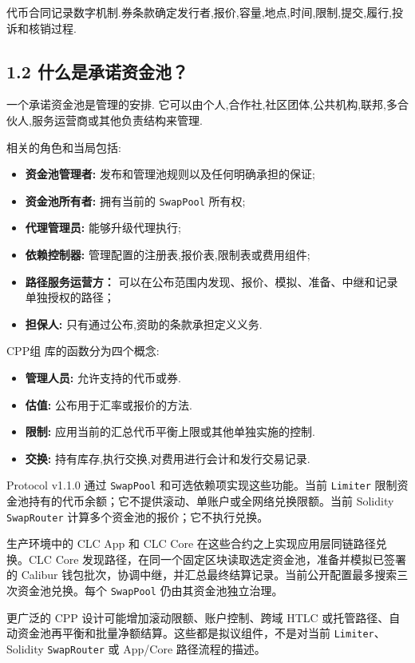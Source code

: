 \documentclass[11pt]{article}
\begin{document}
代币合同记录数字机制.券条款确定发行者,报价,容量,地点,时间,限制,提交,履行,投诉和核销过程.

\subsection*{1.2 什么是承诺资金池？}

一个承诺资金池是管理的安排. 它可以由个人,合作社,社区团体,公共机构,联邦,多合伙人,服务运营商或其他负责结构来管理.

相关的角色和当局包括:

\begin{itemize}[leftmargin=*]
\item \textbf{资金池管理者:} 发布和管理池规则以及任何明确承担的保证;
\item \textbf{资金池所有者:} 拥有当前的 \texttt{SwapPool} 所有权;
\item \textbf{代理管理员:} 能够升级代理执行;
\item \textbf{依赖控制器:} 管理配置的注册表,报价表,限制表或费用组件;
\item \textbf{路径服务运营方：} 可以在公布范围内发现、报价、模拟、准备、中继和记录单独授权的路径；
\item \textbf{担保人:} 只有通过公布,资助的条款承担定义义务.
\end{itemize}
CPP组 库的函数分为四个概念:

\begin{itemize}[leftmargin=*]
\item \textbf{管理人员:} 允许支持的代币或券.
\item \textbf{估值:} 公布用于汇率或报价的方法.
\item \textbf{限制:} 应用当前的汇总代币平衡上限或其他单独实施的控制.
\item \textbf{交换:} 持有库存,执行交换,对费用进行会计和发行交易记录.
\end{itemize}
Protocol v1.1.0 通过 \texttt{SwapPool} 和可选依赖项实现这些功能。当前 \texttt{Limiter} 限制资金池持有的代币余额；它不提供滚动、单账户或全网络兑换限额。当前 Solidity \texttt{SwapRouter} 计算多个资金池的报价；它不执行兑换。

生产环境中的 CLC App 和 CLC Core 在这些合约之上实现应用层同链路径兑换。CLC Core 发现路径，在同一个固定区块读取选定资金池，准备并模拟已签署的 Calibur 钱包批次，协调中继，并汇总最终结算记录。当前公开配置最多搜索三次资金池兑换。每个 \texttt{SwapPool} 仍由其资金池独立治理。

更广泛的 CPP 设计可能增加滚动限额、账户控制、跨域 HTLC 或托管路径、自动资金池再平衡和批量净额结算。这些都是拟议组件，不是对当前 \texttt{Limiter}、Solidity \texttt{SwapRouter} 或 App/Core 路径流程的描述。
\end{document}
